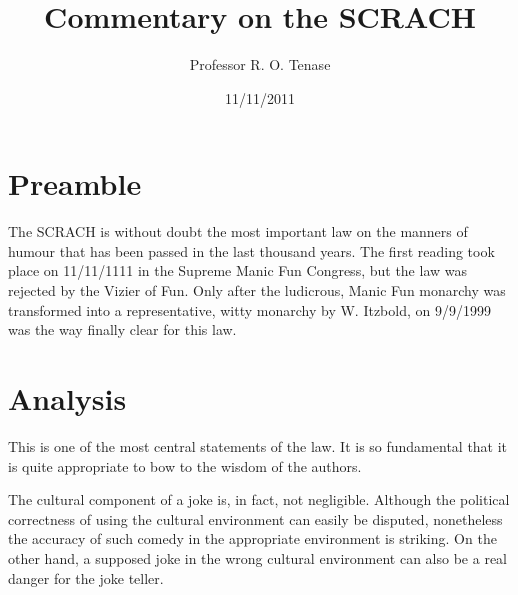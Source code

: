 \documentclass{scrartcl}
\begin{document}
\title{Commentary on the SCRACH}
\author{Professor R. O. Tenase}
\date{11/11/2011}
\maketitle
\tableofcontents

\section{Preamble}
The SCRACH is without doubt the most important law on the manners of humour
that has been passed in the last thousand years. The first reading took place
on 11/11/1111 in the Supreme Manic Fun Congress, but the law was rejected by
the Vizier of Fun. Only after the ludicrous, Manic Fun monarchy was
transformed into a representative, witty monarchy by W. Itzbold, on 9/9/1999
was the way finally clear for this law.

\section{Analysis}

\begin{addmargin}[0pt]{.333\textwidth}
  This is one of the most central statements of the law. It is so fundamental
  that it is quite appropriate to bow to the wisdom of the authors.

  \syncwithnotecolumn[paragraphs]\bigskip
  The cultural component of a joke is, in fact, not negligible. Although the
  political correctness of using the cultural environment can easily be 
  disputed, nonetheless the accuracy of such comedy in the appropriate
  environment is striking. On the other hand, a supposed joke in the wrong
  cultural environment can also be a real danger for the joke teller.
\end{addmargin}
\end{document}
